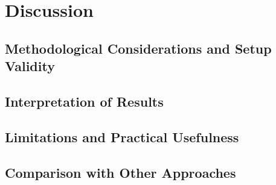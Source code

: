 


\section{Discussion}  \label{sec:discussion}


\subsection{Methodological Considerations and Setup Validity}

\subsection{Interpretation of Results}

\subsection{Limitations and Practical Usefulness}

\subsection{Comparison with Other Approaches}





